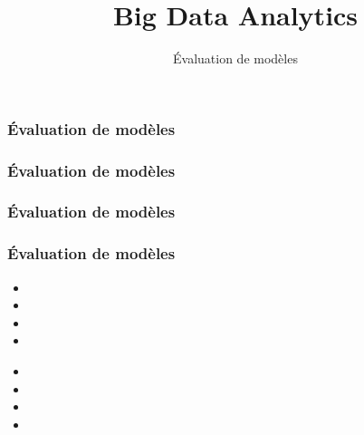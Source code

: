 \documentclass{formation}
\title{Big Data Analytics}
\subtitle{Évaluation de modèles}
\begin{document}
\maketitle

\begin{frame}
  \frametitle{Évaluation de modèles}
\end{frame}

\begin{frame}
  \frametitle{Évaluation de modèles}
  
\end{frame}

\begin{frame}
  \frametitle{Évaluation de modèles}
\end{frame}

\begin{frame}
  \frametitle{Évaluation de modèles}

  
  \begin{itemize}
  \item 
  \item 
  \item 
  \item 
  \end{itemize}

  \begin{minipage}[l]{0.49\linewidth}
  \end{minipage}\hfill
  \begin{minipage}[l]{0.49\linewidth}
  \end{minipage}\hfill

  \begin{minipage}[l]{0.49\linewidth}
      \begin{itemize}
      \item 
      \item 
      \item 
      \item 
      \end{itemize}
  \end{minipage}\hfill
  \begin{minipage}[l]{0.49\linewidth}
  \end{minipage}\hfill

\end{frame}
\end{document}
